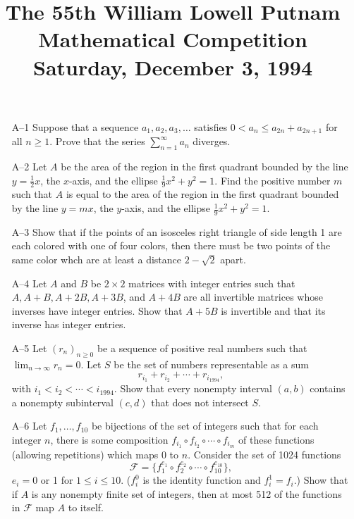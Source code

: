 \documentclass[amssymb,twocolumn,pra,10pt,aps]{revtex4-1}
\begin{document}
\title{The 55th William Lowell Putnam Mathematical Competition \\
    Saturday, December 3, 1994}
\maketitle

\begin{itemize}

\item[A--1]
Suppose that a sequence $a_1, a_2, a_3, \dots$ satisfies
$0 < a_n \leq a_{2n} + a_{2n+1}$ for all $n \geq 1$. Prove that the series
$\sum_{n=1}^{\infty} a_n$ diverges.

\item[A--2]
Let $A$ be the area of the region in the first quadrant bounded by the
line $y = \frac{1}{2} x$, the $x$-axis, and the ellipse $\frac{1}{9} x^2
+ y^2 = 1$. Find the positive number $m$ such that $A$ is equal to the
area of the region in the first quadrant bounded by the line $y = mx$,
the $y$-axis, and the ellipse $\frac{1}{9} x^2 + y^2 = 1$.

\item[A--3]
Show that if the points of an isosceles right triangle of side length
1 are each colored with one of four colors, then there must be two points
of the same color whch are at least a distance $2 - \sqrt{2}$ apart.

\item[A--4]
Let $A$ and $B$ be $2 \times 2$ matrices with integer entries such
that $A, A+B, A+2B, A+3B$, and $A+4B$ are all invertible matrices whose
inverses have integer entries. Show that $A+5B$ is invertible and that
its inverse has integer entries.

\item[A--5]
Let $(r_n)_{n \geq 0}$ be a sequence of positive real numbers such that
$\lim_{n \to \infty} r_n = 0$. Let $S$ be the set of numbers representable
as a sum
\[
r_{i_1} + r_{i_2} + \cdots + r_{i_{1994}},
\]
with $i_1 < i_2 < \cdots < i_{1994}$. Show that every nonempty interval
$(a,b)$ contains a nonempty subinterval $(c,d)$ that does not intersect $S$.

\item[A--6]
Let $f_1, \dots, f_{10}$ be bijections of the set of integers such that for
each integer $n$, there is some composition $f_{i_1} \circ f_{i_2}
\circ \cdots \circ f_{i_m}$ of these functions (allowing repetitions)
which maps 0 to $n$. Consider the set of 1024 functions
\[
\mathcal{F} = \{f_1^{e_1} \circ f_2^{e_2} \circ \cdots \circ f_{10}^{e_{10}}\},
\]
$e_i = 0$ or 1 for $1 \leq i \leq 10$. ($f_i^0$ is the identity function
and $f_i^1 = f_i$.) Show that if $A$ is any nonempty finite set of
integers, then at most 512 of the functions in $\mathcal{F}$ map $A$ to
itself.


\end{itemize}
\end{document}
